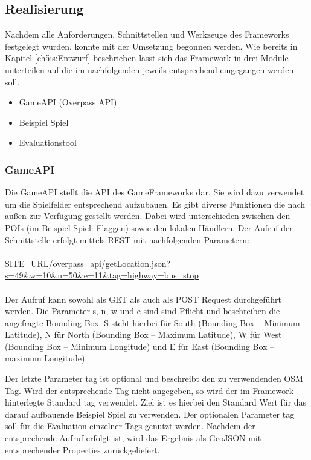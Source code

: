 \subsection*{Realisierung}

Nachdem alle Anforderungen, Schnittstellen und Werkzeuge des Frameworks festgelegt wurden, konnte mit der Umsetzung begonnen werden.
Wie bereits in Kapitel \ref{ch5:s:Entwurf} beschrieben lässt sich das Framework in drei Module unterteilen auf die im nachfolgenden jeweils entsprechend eingegangen werden soll.

\begin{itemize}

\item GameAPI (Overpass API)
\item Beispiel Spiel
\item Evaluationstool

\end{itemize}

\subsubsection*{GameAPI}

Die GameAPI stellt die API des GameFrameworks dar. Sie wird dazu verwendet um die Spielfelder entsprechend aufzubauen.
Es gibt diverse Funktionen die nach außen zur Verfügung gestellt werden.
Dabei wird unterschieden zwischen den POIs (im Beispiel Spiel: Flaggen) sowie den lokalen Händlern.
Der Aufruf der Schnittstelle erfolgt mittels REST mit nachfolgenden Parametern:
\\\\
\url{SITE\_URL/overpass\_api/getLocation.json?s=49&w=10&n=50&e=11&tag=highway=bus\_stop}
\\\\
Der Aufruf kann sowohl als GET als auch als POST Request durchgeführt werden. Die Parameter s, n, w und e sind sind Pflicht und beschreiben die angefragte Bounding Box.
S steht hierbei für South (Bounding Box -- Minimum Latitude), N für North (Bounding Box -- Maximum Latitude), W für West (Bounding Box -- Minimum Longitude) und E für East (Bounding Box -- maximum Longitude).

Der letzte Parameter tag ist optional und beschreibt den zu verwendenden OSM Tag. Wird der entsprechende Tag nicht angegeben, so wird der im Framework hinterlegte Standard tag verwendet. Ziel ist es hierbei den Standard Wert für das darauf aufbauende Beispiel Spiel zu verwenden. Der optionalen Parameter tag soll für die Evaluation einzelner Tags genutzt werden. Nachdem der entsprechende Aufruf erfolgt ist, wird das Ergebnis als GeoJSON mit entsprechender Properties zurückgeliefert.
\\\\ %

